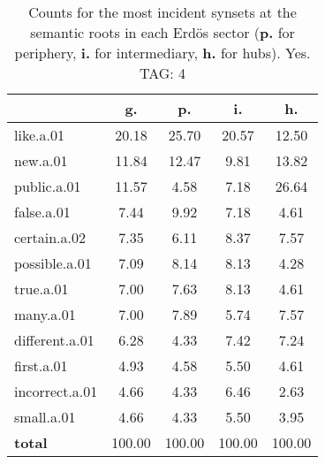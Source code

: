 \begin{table}[h!]
\begin{center}
\begin{tabular}{| l || c | c | c | c |}\hline
 & {\bf g.} & {\bf p.} & {\bf i.} & {\bf h.} \\\hline\hline
like.a.01 & 20.18  & 25.70  & 20.57  & 12.50 \\\hline
new.a.01 & 11.84  & 12.47  & 9.81  & 13.82 \\\hline
public.a.01 & 11.57  & 4.58  & 7.18  & 26.64 \\\hline
false.a.01 & 7.44  & 9.92  & 7.18  & 4.61 \\\hline
certain.a.02 & 7.35  & 6.11  & 8.37  & 7.57 \\\hline
possible.a.01 & 7.09  & 8.14  & 8.13  & 4.28 \\\hline
true.a.01 & 7.00  & 7.63  & 8.13  & 4.61 \\\hline
many.a.01 & 7.00  & 7.89  & 5.74  & 7.57 \\\hline
different.a.01 & 6.28  & 4.33  & 7.42  & 7.24 \\\hline
first.a.01 & 4.93  & 4.58  & 5.50  & 4.61 \\\hline
incorrect.a.01 & 4.66  & 4.33  & 6.46  & 2.63 \\\hline
small.a.01 & 4.66  & 4.33  & 5.50  & 3.95 \\\hline\hline
{{\bf total}} & 100.00  & 100.00  & 100.00  & 100.00 \\\hline
\end{tabular}
\caption{Counts for the most incident synsets at the semantic roots in each Erd\"os sector ({\bf p.} for periphery, {\bf i.} for intermediary, {\bf h.} for hubs). Yes. TAG: 4}
\end{center}
\end{table}